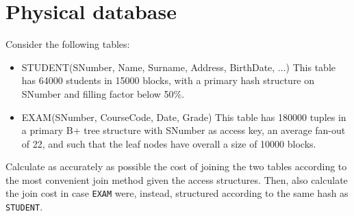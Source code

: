 \section{Physical database}

Consider the following tables: 
\begin{itemize}
    \item STUDENT(SNumber, Name, Surname, Address, BirthDate, $\dots$)
        This table has 64000 students in 15000 blocks, with a primary hash structure on SNumber and filling factor below 50\%. 
    \item EXAM(SNumber, CourseCode, Date, Grade)
        This table has 180000 tuples in a primary B+ tree structure with SNumber as access key, an average fan-out of 22, and such that the leaf nodes have overall a size of 10000 blocks. 
\end{itemize}
Calculate as accurately as possible the cost of joining the two tables according to the most convenient join method given the access structures.
Then, also calculate the join cost in case \texttt{EXAM} were, instead, structured according to the same hash as \texttt{STUDENT}.
























































